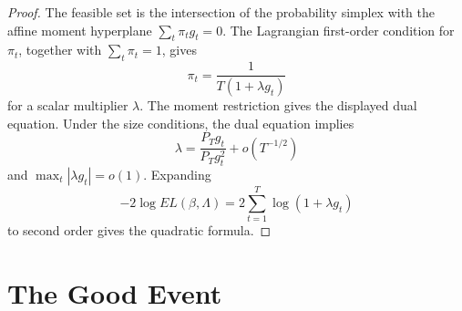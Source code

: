 \documentclass[12pt]{article}
\numberwithin{equation}{section}
\theoremstyle{definition}
\begin{document}
\begin{proof}
The feasible set is the intersection of the probability simplex with the affine
moment hyperplane \(\sum_t\pi_tg_t=0\). The Lagrangian first-order condition for
\(\pi_t\), together with \(\sum_t\pi_t=1\), gives
\[
    \pi_t=\frac{1}{T(1+\lambda g_t)}
\]
for a scalar multiplier \(\lambda\). The moment restriction gives the displayed
dual equation. Under the size conditions, the dual equation implies
\[
    \lambda=\frac{P_Tg_t}{P_Tg_t^2}+o(T^{-1/2})
\]
and \(\max_t|\lambda g_t|=o(1)\). Expanding
\[
    -2\log EL(\beta,\Lambda)
    =
    2\sum_{t=1}^T\log(1+\lambda g_t)
\]
to second order gives the quadratic formula.
\end{proof}

\section{The Good Event}
\end{document}

